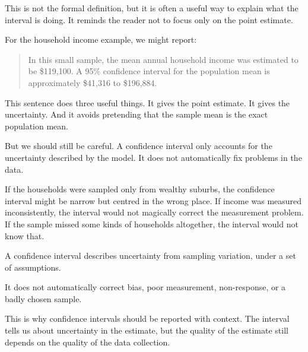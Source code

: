 \documentclass[
  letterpaper,
  DIV=11,
  numbers=noendperiod]{scrreprt}
\begin{document}
This is not the formal definition, but it is often a useful way to
explain what the interval is doing. It reminds the reader not to focus
only on the point estimate.

For the household income example, we might report:

\begin{quote}
In this small sample, the mean annual household income was estimated to
be \$119,100. A 95\% confidence interval for the population mean is
approximately \$41,316 to \$196,884.
\end{quote}

This sentence does three useful things. It gives the point estimate. It
gives the uncertainty. And it avoids pretending that the sample mean is
the exact population mean.

But we should still be careful. A confidence interval only accounts for
the uncertainty described by the model. It does not automatically fix
problems in the data.

If the households were sampled only from wealthy suburbs, the confidence
interval might be narrow but centred in the wrong place. If income was
measured inconsistently, the interval would not magically correct the
measurement problem. If the sample missed some kinds of households
altogether, the interval would not know that.

\begin{tcolorbox}[enhanced jigsaw, arc=.35mm, bottomrule=.15mm, bottomtitle=1mm, breakable, colback=white, colbacktitle=quarto-callout-warning-color!10!white, colframe=quarto-callout-warning-color-frame, coltitle=black, left=2mm, leftrule=.75mm, opacityback=0, opacitybacktitle=0.6, rightrule=.15mm, title=\textcolor{quarto-callout-warning-color}{\faExclamationTriangle}\hspace{0.5em}{Confidence intervals do not fix bad data}, titlerule=0mm, toprule=.15mm, toptitle=1mm]

A confidence interval describes uncertainty from sampling variation,
under a set of assumptions.

It does not automatically correct bias, poor measurement, non-response,
or a badly chosen sample.

\end{tcolorbox}

This is why confidence intervals should be reported with context. The
interval tells us about uncertainty in the estimate, but the quality of
the estimate still depends on the quality of the data collection.
\end{document}
